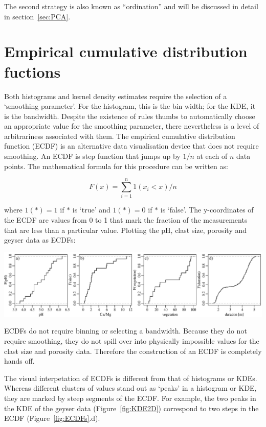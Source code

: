 The second strategy is also known as ``ordination'' and will be
discussed in detail in section~\ref{sec:PCA}.

\section{Empirical cumulative distribution fuctions}
\label{sec:ECDF}

Both histograms and kernel density estimates require the selection of
a `smoothing parameter'. For the histogram, this is the bin width; for
the KDE, it is the bandwidth. Despite the existence of rules thumbs to
automatically choose an appropriate value for the smoothing parameter,
there nevertheless is a level of arbitrariness associated with
them. The empirical cumulative distribution function (ECDF) is an
alternative data visualisation device that does not require
smoothing. An ECDF is step function that jumps up by $1/n$ at each of
$n$ data points.  The mathematical formula for this procedure can be
written as:
  
  \begin{equation}
    F(x) = \sum\limits_{i=1}^{n} 1(x_i<x)/n
    \label{eq:ECDF}
  \end{equation}
 
\noindent where $1(\ast) = 1$ if $\ast$ is `true' and $1(\ast) = 0$ if
$\ast$ is `false'. The y-coordinates of the ECDF are values from 0 to
1 that mark the fraction of the measurements that are less than a
particular value.  Plotting the pH, clast size, porosity and geyser
data as ECDFs:

\noindent\includegraphics[width=\textwidth]{../figures/ECDFs.pdf}
\begingroup
{}
\label{fig:ECDFs}
\endgroup

ECDFs do not require binning or selecting a bandwidth.  Because they
do not require smoothing, they do not spill over into physically
impossible values for the clast size and porosity data. Therefore the
construction of an ECDF is completely hands off.\medskip

The visual interpetation of ECDFs is different from that of histograms
or KDEs. Whereas different clusters of values stand out as `peaks' in
a histogram or KDE, they are marked by steep segments of the ECDF. For
example, the two peaks in the KDE of the geyser data
(Figure~\ref{fig:KDE2D}) correspond to two steps in the ECDF
(Figure~\ref{fig:ECDFs}.d).
